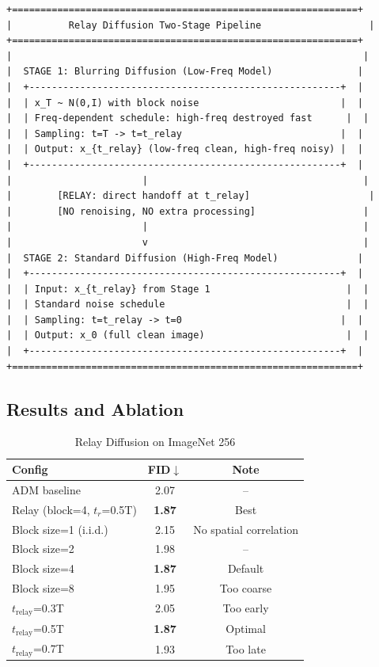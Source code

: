 \documentclass[11pt, a4paper]{article}
\begin{document}
\begin{lstlisting}[style=flowchart, caption={Relay Diffusion Pipeline}]
+=============================================================+
|          Relay Diffusion Two-Stage Pipeline                   |
+=============================================================+
|                                                              |
|  STAGE 1: Blurring Diffusion (Low-Freq Model)               |
|  +-------------------------------------------------------+  |
|  | x_T ~ N(0,I) with block noise                         |  |
|  | Freq-dependent schedule: high-freq destroyed fast      |  |
|  | Sampling: t=T -> t=t_relay                            |  |
|  | Output: x_{t_relay} (low-freq clean, high-freq noisy) |  |
|  +-------------------------------------------------------+  |
|                       |                                      |
|        [RELAY: direct handoff at t_relay]                     |
|        [NO renoising, NO extra processing]                   |
|                       |                                      |
|                       v                                      |
|  STAGE 2: Standard Diffusion (High-Freq Model)              |
|  +-------------------------------------------------------+  |
|  | Input: x_{t_relay} from Stage 1                        |  |
|  | Standard noise schedule                                |  |
|  | Sampling: t=t_relay -> t=0                            |  |
|  | Output: x_0 (full clean image)                         |  |
|  +-------------------------------------------------------+  |
+=============================================================+
\end{lstlisting}

\subsection{Results and Ablation}

\begin{table}[H]
\centering
\caption{Relay Diffusion on ImageNet 256}
\begin{tabular}{lcc}
\toprule
Config & FID$\downarrow$ & Note \\
\midrule
ADM baseline & 2.07 & -- \\
Relay (block=4, $t_r$=0.5T) & \textbf{1.87} & Best \\
\midrule
Block size=1 (i.i.d.) & 2.15 & No spatial correlation \\
Block size=2 & 1.98 & -- \\
Block size=4 & \textbf{1.87} & Default \\
Block size=8 & 1.95 & Too coarse \\
\midrule
$t_{\mathrm{relay}}$=0.3T & 2.05 & Too early \\
$t_{\mathrm{relay}}$=0.5T & \textbf{1.87} & Optimal \\
$t_{\mathrm{relay}}$=0.7T & 1.93 & Too late \\
\bottomrule
\end{tabular}
\end{table}
\end{document}
